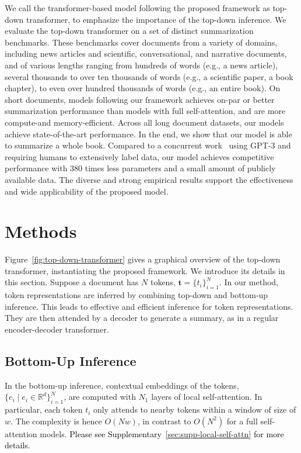 We call the transformer-based model following the proposed framework as top-down transformer, to emphasize the importance of the top-down inference.  We evaluate the top-down transformer on a set of distinct summarization benchmarks. These benchmarks cover documents from a variety of domains, including news articles and scientific, conversational, and narrative documents, and of various lengths ranging from hundreds of words (e.g., a news article), several thousands to over ten thousands of words (e.g., a scientific paper, a book chapter), to even over hundred thousands of words (e.g., an entire book). On short documents, models following our framework achieves on-par or better summarization performance than models with full self-attention, and are more compute-and memory-efficient. Across all long document datasets, our models achieve state-of-the-art performance. In the end, we show that our model is able to summarize a whole book. Compared to a concurrent work~\citep{wu2021recursively} using GPT-3 and requiring humans to extensively label data, our model achieves competitive performance with 380 times less parameters and a small amount of publicly available data. The diverse and strong empirical results support the effectiveness and wide applicability of the proposed model.

\section{Methods}
Figure~\ref{fig:top-down-transformer} gives a graphical overview of the top-down transformer, instantiating the proposed framework. We introduce its details in this section. Suppose a document has $N$ tokens, $\bm{t} = \{t_i\}_{i=1}^N$. In our method, token representations are inferred by combining top-down and bottom-up inference. This leads to effective and efficient inference for token representations. They are then attended by a decoder to generate a summary, as in a regular encoder-decoder transformer.

\subsection{Bottom-Up Inference}
In the bottom-up inference, contextual embeddings of the tokens, $\{e_i \mid e_i \in \mathbb{R}^d\}_{i=1}^N$, are computed with $N_1$ layers of local self-attention. In particular, each token $t_i$ only attends to nearby tokens within a window of size of $w$. The complexity is hence $O(Nw)$, in contrast to $O(N^2)$ for a full self-attention models. \textcolor{black}{Please see Supplementary~\ref{sec:supp-local-self-attn} for more details.} 


